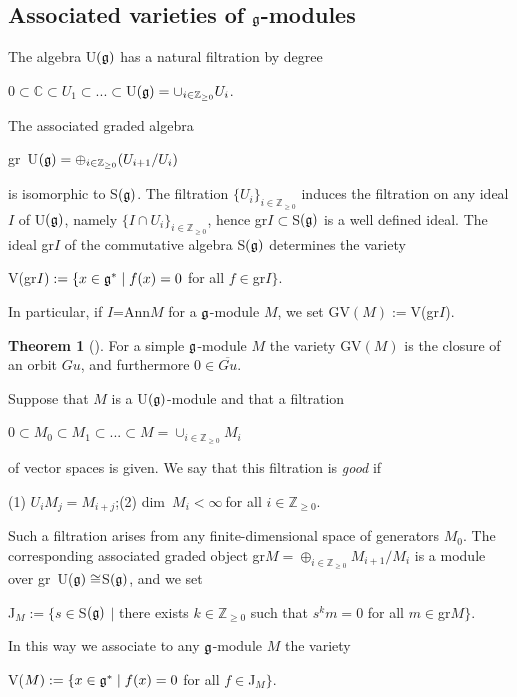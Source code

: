 \documentclass[12pt]{amsart}
\theoremstyle{definition}\newtheorem{theorem}{Theorem}[section]
\theoremstyle{definition}\newtheorem{definition}[proposition]{Definition}
\theoremstyle{remark}\newtheorem{example}[proposition]{Example}
\begin{document}
\subsection{Associated varieties of $\frak g$-modules}\label{SSavg} The algebra U$(\frak g)$ has a natural filtration  by degree \begin{center}$0\subset\mathbb C\subset U_1\subset...\subset$U$(\frak g)=\cup_{i\in\mathbb Z_{\ge0}}U_i$.\end{center} The associated graded algebra \begin{center}gr~U$(\frak g) =\oplus_{i\in\mathbb Z_{\ge0}}(U_{i+1}/U_i)$\end{center} is isomorphic to S$(\frak g)$. The filtration $\{U_i\}_{i\in\mathbb Z_{\ge0}}$ induces the filtration on any ideal $I$ of U$(\frak g)$, namely $\{I\cap U_i\}_{i\in\mathbb Z_{\ge0}}$, hence gr$I\subset$S$(\frak g)$ is a well defined ideal. The ideal gr$I$ of the commutative algebra S$(\frak g)$ determines the variety
\begin{center}V(gr$I):=\{x\in\frak g^*\mid f(x)=0$ for all $f\in$gr$I\}$.\end{center}
In particular, if $I$=Ann$M$ for a $\frak g$-module $M$, we set GV$(M):=$V(gr$I$).
\begin{theorem}[\cite{Jo}] For a simple $\frak g$-module $M$ the variety GV$(M)$ is the closure of an orbit $Gu$, and furthermore $0\in\overline{Gu}$.\end{theorem}
Suppose that $M$ is a U$(\frak g)$-module and that a filtration \begin{center}$0\subset M_0\subset M_1\subset...\subset M=\cup_{i\in \mathbb Z_{\ge 0}}M_i$\end{center} of vector spaces is given. We say that this filtration is {\it good} if\begin{center}(1) $U_i M_j= M_{i+j}$;\hspace{40pt}(2) dim~$M_i<\infty~$for all $i\in\mathbb Z_{\ge 0}$.\end{center}
Such a filtration arises from any finite-dimensional space of generators $M_0$. The corresponding associated graded object gr$M=\oplus_{i\in\mathbb Z_{\ge0}}M_{i+1}/M_i$ is a module over gr~U($\frak{g})\cong$S$(\frak g)$, and we set
\begin{center}J$_M:=\{s\in $S$(\frak g)$ $\mid$ there exists $k\in \mathbb Z_{\ge0}$ such that $s^km=0$ for all $m\in $gr$M\}.$\end{center}
In this way we associate to any $\frak g$-module $M$ the variety
\begin{center}V($M):=\{x\in\frak g^*\mid f(x)=0$ for all $f\in$J$_M\}$.\end{center}
\end{document}
